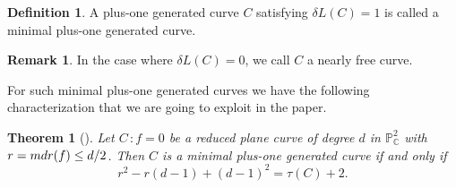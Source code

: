\documentclass[12pt]{article}
\theoremstyle{plain}
\newtheorem{theorem}[thm]{Theorem}
\theoremstyle{definition}
\newtheorem{definition}[thm]{Definition}
\newtheorem{remark}[thm]{Remark}
\begin{document}
\begin{definition}
A plus-one generated curve $C$ satisfying $\delta L(C)=1$ is called a minimal plus-one generated curve.
\end{definition}
\begin{remark}
In the case where $\delta L(C) = 0$, we call $C$ a nearly free curve.
\end{remark}
For such minimal plus-one generated curves we have the following characterization that we are going to exploit in the paper.
\begin{theorem}[{\cite[Theorem 1.5]{DS24}}]
\label{MPOG}
Let $C \, : f=0$ be a reduced plane curve of degree $d$ in $\mathbb{P}^{2}_{\mathbb{C}}$ with $r = {\rm mdr}(f) \leq d/2$. Then $C$ is a minimal plus-one generated curve if and only if
$$r^{2} - r(d-1) + (d-1)^2 = \tau(C)+2.$$

\end{theorem}
\end{document}
